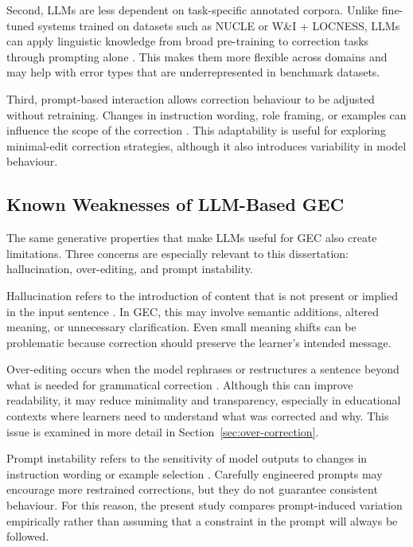 Second, LLMs are less dependent on task-specific annotated corpora. Unlike fine-tuned systems trained on datasets such as NUCLE or W\&I + LOCNESS, LLMs can apply linguistic knowledge from broad pre-training to correction tasks through prompting alone \cite{ng-etal-2014-conll,bryant-etal-2019-bea,NEURIPS2020_1457c0d6}. This makes them more flexible across domains and may help with error types that are underrepresented in benchmark datasets.

Third, prompt-based interaction allows correction behaviour to be adjusted without retraining. Changes in instruction wording, role framing, or examples can influence the scope of the correction \cite{liu2023pretrain}. This adaptability is useful for exploring minimal-edit correction strategies, although it also introduces variability in model behaviour.

\subsection{Known Weaknesses of LLM-Based GEC}

The same generative properties that make LLMs useful for GEC also create limitations. Three concerns are especially relevant to this dissertation: hallucination, over-editing, and prompt instability.

Hallucination refers to the introduction of content that is not present or implied in the input sentence \cite{maynez2020faithfulness}. In GEC, this may involve semantic additions, altered meaning, or unnecessary clarification. Even small meaning shifts can be problematic because correction should preserve the learner's intended message.

Over-editing occurs when the model rephrases or restructures a sentence beyond what is needed for grammatical correction \cite{loem2023exploringeffectivenessgpt3grammatical}. Although this can improve readability, it may reduce minimality and transparency, especially in educational contexts where learners need to understand what was corrected and why. This issue is examined in more detail in Section~\ref{sec:over-correction}.

Prompt instability refers to the sensitivity of model outputs to changes in instruction wording or example selection \cite{liu2023pretrain}. Carefully engineered prompts may encourage more restrained corrections, but they do not guarantee consistent behaviour. For this reason, the present study compares prompt-induced variation empirically rather than assuming that a constraint in the prompt will always be followed.

